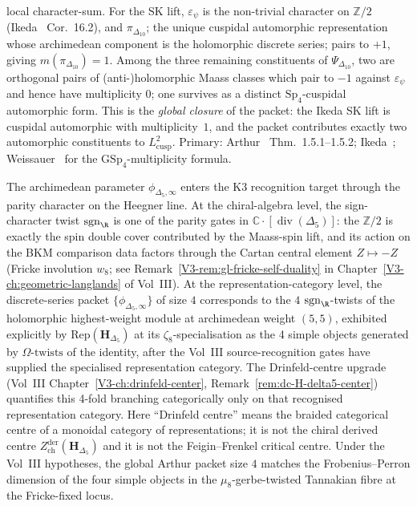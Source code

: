\begin{remark}
local character-sum. For the SK lift, $\varepsilon_\psi$ is the
non-trivial character on $\mathbb{Z}/2$ (Ikeda~\cite{Ikeda2001Lifting}
Cor.\ 16.2), and $\pi_{\Delta_{10}}$; the unique cuspidal
automorphic representation whose archimedean component is the
holomorphic discrete series; pairs to $+1$, giving
$m(\pi_{\Delta_{10}}) = 1$. Among the three remaining constituents of
$\Psi_{\Delta_{10}}$, two are orthogonal pairs of (anti-)holomorphic
Maass classes which pair to $-1$ against
$\varepsilon_\psi$ and hence have multiplicity $0$; one survives as a
distinct $\mathrm{Sp}_4$-cuspidal automorphic form. This is the
\emph{global closure} of the packet: the Ikeda SK lift is cuspidal
automorphic with multiplicity~$1$, and the packet contributes exactly
two automorphic constituents to $L^2_{\mathrm{cusp}}$. Primary:
Arthur~\cite{Arthur2013Endoscopic} Thm.\ 1.5.1--1.5.2;
Ikeda~\cite{Ikeda2001Lifting};
Weissauer~\cite{Weissauer2009GSp4} for the
$\mathrm{GSp}_4$-multiplicity formula.
\end{remark}

\begin{remark}
\label{rem:dl-cross-volume-archimedean}
The archimedean parameter $\phi_{\Delta_5, \infty}$ enters the K3
recognition target through the parity character on the Heegner line.
At the chiral-algebra level, the sign-character twist
$\mathrm{sgn}_\R$ is one of the parity gates in
$\mathbb C\cdot[\operatorname{div}(\Delta_5)]$: the $\mathbb{Z}/2$ is
exactly the spin double cover contributed by the Maass-spin lift, and
its action on the BKM comparison data factors through the Cartan
central element $Z \mapsto -Z$ (Fricke involution $w_8$; see
Remark~\ref{V3-rem:gl-fricke-self-duality} in
Chapter~\ref{V3-ch:geometric-langlands} of Vol~III).
At the representation-category level, the discrete-series packet
$\{\phi_{\Delta_5, \infty}\}$ of size $4$ corresponds to the $4$
$\mathrm{sgn}_\R$-twists of the holomorphic highest-weight module at
archimedean weight $(5, 5)$, exhibited explicitly by
$\mathrm{Rep}(\mathbf{H}_{\Delta_5})$ at its $\zeta_8$-specialisation
as the 4 simple objects generated by $\Omega\text{-twists}$ of the
identity, after the Vol~III source-recognition gates have supplied the
specialised representation category. The Drinfeld-centre upgrade
(Vol~III Chapter~\ref{V3-ch:drinfeld-center},
Remark~\ref{rem:dc-H-delta5-center}) quantifies
this 4-fold branching categorically only on that recognised
representation category. Here ``Drinfeld centre'' means the braided
categorical centre of a monoidal category of representations; it is
not the chiral derived centre
$Z^{\mathrm{der}}_{\mathrm{ch}}(\mathbf H_{\Delta_5})$ and it is not
the Feigin--Frenkel critical centre. Under the Vol~III hypotheses, the
global Arthur packet size $4$ matches the Frobenius--Perron dimension
of the four simple objects in the $\mu_8$-gerbe-twisted Tannakian
fibre at the Fricke-fixed locus.
\end{remark}


